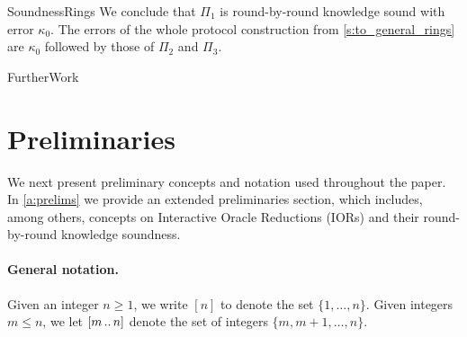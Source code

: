 \begin{lncsmove}{SoundnessRings}
We conclude that $\Pi_1$ is  round-by-round knowledge sound with error $\kappa_0$. The errors of the whole protocol construction from \cref{s:to_general_rings} are $\kappa_0$ followed by those of $\Pi_2$ and $\Pi_3$.







\end{lncsmove}
\begin{lncsmove}{FurtherWork} %

\end{lncsmove}
\section{Preliminaries}

We next present preliminary concepts and notation used throughout the paper.
\iflncs In \cref{a:prelims} we provide an extended preliminaries section, which includes, among others, concepts on Interactive Oracle Reductions (IORs) and their round-by-round knowledge soundness.\fi

\paragraph{General notation.} Given an integer $n\geq 1$, we write $[n]$ to denote the set $\{1,\ldots, n\}$. Given integers $m\leq n$, we let $[m \, .. \, n]$ denote the set of integers $\{m, m+1, \ldots, n\}$.

